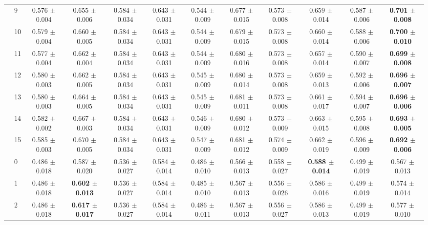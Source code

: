 \begin{table*}[t]
{\begin{tabular}{%
  ll
  @{\quad}
  c@{\hskip 4pt}c
  @{\quad\quad}
  c@{\hskip 4pt}c
  @{\quad\quad}
  c@{\hskip 4pt}c
  @{\quad\quad}
  c@{\hskip 4pt}c
  @{\quad\quad}
  c@{\hskip 4pt}c
}
        & 9 & 0.576 $\pm$ 0.004 & 0.655 $\pm$ 0.006 & 0.584 $\pm$ 0.034 & 0.643 $\pm$ 0.031 & 0.544 $\pm$ 0.009 & 0.677 $\pm$ 0.015 & 0.573 $\pm$ 0.008 & 0.659 $\pm$ 0.014 & 0.587 $\pm$ 0.006 & \textbf{0.701 $\pm$ 0.008} \\
        & 10 & 0.579 $\pm$ 0.004 & 0.660 $\pm$ 0.005 & 0.584 $\pm$ 0.034 & 0.643 $\pm$ 0.031 & 0.544 $\pm$ 0.009 & 0.679 $\pm$ 0.015 & 0.573 $\pm$ 0.008 & 0.660 $\pm$ 0.014 & 0.588 $\pm$ 0.006 & \textbf{0.700 $\pm$ 0.010} \\
        & 11 & 0.577 $\pm$ 0.004 & 0.662 $\pm$ 0.004 & 0.584 $\pm$ 0.034 & 0.643 $\pm$ 0.031 & 0.544 $\pm$ 0.009 & 0.680 $\pm$ 0.016 & 0.573 $\pm$ 0.008 & 0.657 $\pm$ 0.014 & 0.590 $\pm$ 0.007 & \textbf{0.699 $\pm$ 0.008} \\
        & 12 & 0.580 $\pm$ 0.003 & 0.662 $\pm$ 0.005 & 0.584 $\pm$ 0.034 & 0.643 $\pm$ 0.031 & 0.545 $\pm$ 0.009 & 0.680 $\pm$ 0.014 & 0.573 $\pm$ 0.008 & 0.659 $\pm$ 0.013 & 0.592 $\pm$ 0.006 & \textbf{0.696 $\pm$ 0.007} \\
        & 13 & 0.580 $\pm$ 0.003 & 0.664 $\pm$ 0.005 & 0.584 $\pm$ 0.034 & 0.643 $\pm$ 0.031 & 0.545 $\pm$ 0.009 & 0.681 $\pm$ 0.011 & 0.573 $\pm$ 0.008 & 0.661 $\pm$ 0.017 & 0.594 $\pm$ 0.007 & \textbf{0.696 $\pm$ 0.006} \\
        & 14 & 0.582 $\pm$ 0.002 & 0.667 $\pm$ 0.003 & 0.584 $\pm$ 0.034 & 0.643 $\pm$ 0.031 & 0.546 $\pm$ 0.009 & 0.680 $\pm$ 0.012 & 0.573 $\pm$ 0.009 & 0.663 $\pm$ 0.015 & 0.595 $\pm$ 0.008 & \textbf{0.693 $\pm$ 0.005} \\
        & 15 & 0.585 $\pm$ 0.003 & 0.670 $\pm$ 0.005 & 0.584 $\pm$ 0.034 & 0.643 $\pm$ 0.031 & 0.547 $\pm$ 0.009 & 0.681 $\pm$ 0.012 & 0.574 $\pm$ 0.009 & 0.662 $\pm$ 0.019 & 0.596 $\pm$ 0.009 & \textbf{0.692 $\pm$ 0.006} \\
\midrule
\assist{} & 0 & 0.486 $\pm$ 0.018 & 0.587 $\pm$ 0.020 & 0.536 $\pm$ 0.027 & 0.584 $\pm$ 0.014 & 0.486 $\pm$ 0.010 & 0.566 $\pm$ 0.013 & 0.558 $\pm$ 0.027 & \textbf{0.588 $\pm$ 0.014} & 0.499 $\pm$ 0.019 & 0.567 $\pm$ 0.013 \\
        & 1 & 0.486 $\pm$ 0.018 & \textbf{0.602 $\pm$ 0.013} & 0.536 $\pm$ 0.027 & 0.584 $\pm$ 0.014 & 0.485 $\pm$ 0.010 & 0.567 $\pm$ 0.013 & 0.556 $\pm$ 0.026 & 0.586 $\pm$ 0.016 & 0.499 $\pm$ 0.019 & 0.574 $\pm$ 0.014 \\
        & 2 & 0.486 $\pm$ 0.018 & \textbf{0.617 $\pm$ 0.017} & 0.536 $\pm$ 0.027 & 0.584 $\pm$ 0.014 & 0.486 $\pm$ 0.011 & 0.567 $\pm$ 0.013 & 0.556 $\pm$ 0.027 & 0.586 $\pm$ 0.013 & 0.499 $\pm$ 0.019 & 0.577 $\pm$ 0.010 \\

\end{tabular}}
\end{table*}
